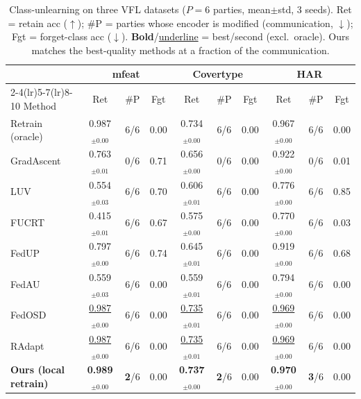 \begin{table}[t]\centering\small
\caption{Class-unlearning on three VFL datasets ($P{=}6$ parties, mean$\pm$std, 3 seeds). Ret = retain acc ($\uparrow$); \#P = parties whose encoder is modified (communication, $\downarrow$); Fgt = forget-class acc ($\downarrow$). \textbf{Bold}/\underline{underline} = best/second (excl.\ oracle). Ours matches the best-quality methods at a fraction of the communication.}
\begin{tabular}{lccccccccc}\toprule
 & \multicolumn{3}{c}{mfeat} & \multicolumn{3}{c}{Covertype} & \multicolumn{3}{c}{HAR} \\
\cmidrule(lr){2-4}\cmidrule(lr){5-7}\cmidrule(lr){8-10}
Method & Ret & \#P & Fgt & Ret & \#P & Fgt & Ret & \#P & Fgt \\\midrule
Retrain (oracle) & 0.987$_{\pm0.00}$ & 6/6 & 0.00 & 0.734$_{\pm0.00}$ & 6/6 & 0.00 & 0.967$_{\pm0.00}$ & 6/6 & 0.00 \\
\midrule
GradAscent & 0.763$_{\pm0.01}$ & 0/6 & 0.71 & 0.656$_{\pm0.00}$ & 0/6 & 0.00 & 0.922$_{\pm0.00}$ & 0/6 & 0.01 \\
LUV & 0.554$_{\pm0.03}$ & 6/6 & 0.70 & 0.606$_{\pm0.01}$ & 6/6 & 0.00 & 0.776$_{\pm0.00}$ & 6/6 & 0.85 \\
FUCRT & 0.415$_{\pm0.01}$ & 6/6 & 0.67 & 0.575$_{\pm0.00}$ & 6/6 & 0.00 & 0.770$_{\pm0.00}$ & 6/6 & 0.03 \\
FedUP & 0.797$_{\pm0.00}$ & 6/6 & 0.74 & 0.645$_{\pm0.01}$ & 6/6 & 0.00 & 0.919$_{\pm0.00}$ & 6/6 & 0.68 \\
FedAU & 0.559$_{\pm0.03}$ & 6/6 & 0.00 & 0.559$_{\pm0.01}$ & 6/6 & 0.00 & 0.794$_{\pm0.00}$ & 6/6 & 0.00 \\
FedOSD & \underline{0.987}$_{\pm0.00}$ & 6/6 & 0.00 & \underline{0.735}$_{\pm0.01}$ & 6/6 & 0.00 & \underline{0.969}$_{\pm0.00}$ & 6/6 & 0.00 \\
RAdapt & \underline{0.987}$_{\pm0.00}$ & 6/6 & 0.00 & \underline{0.735}$_{\pm0.01}$ & 6/6 & 0.00 & \underline{0.969}$_{\pm0.00}$ & 6/6 & 0.00 \\
\textbf{Ours (local retrain)} & \textbf{0.989}$_{\pm0.00}$ & \textbf{2}/6 & 0.00 & \textbf{0.737}$_{\pm0.00}$ & \textbf{2}/6 & 0.00 & \textbf{0.970}$_{\pm0.00}$ & \textbf{3}/6 & 0.00 \\
\bottomrule\end{tabular}\end{table}

